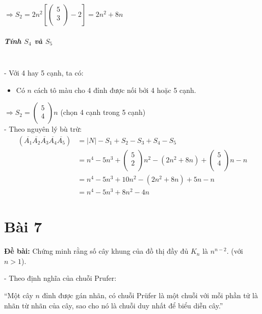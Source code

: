 \documentclass[12pt]{article}
\begin{document}
\begin{sloppypar}
\(\Rightarrow S_{2} = 2n^{2}\left[\begin{pmatrix} 5 \\ 3 \\ \end{pmatrix} - 2\right] = 2n^{2} + 8n\)


\subparagraph{Tính \(S_{4}\) và \(S_{5}\)}\mbox{}\\

- Với 4 hay 5 cạnh, ta có:
\begin{itemize}
    \item Có \(n\) cách tô màu cho 4 đỉnh được nối bởi 4 hoặc 5 cạnh.
\end{itemize}

\(\Rightarrow S_{2} =  \begin{pmatrix} 5 \\ 4 \\ \end{pmatrix}n\) (chọn 4 cạnh trong 5 cạnh) \\

- Theo nguyên lý bù trừ:
\begin{align*}
    (\overline{A_{1}}\overline{A_{2}}\overline{A_{3}}\overline{A_{4}}\overline{A_{5}}) & = |N| - S_{1} + S_{2} - S_{3} + S_{4} - S_{5} \\
    & = n^{4} - 5n^{3} + \begin{pmatrix} 5 \\ 2 \\ \end{pmatrix}n^{2} - (2n^{2} + 8n) + \begin{pmatrix} 5 \\ 4 \\ \end{pmatrix}n-n \\
    & = n^{4} - 5n^{3} + 10n^{2} - (2n^{2} + 8n) + 5n -n \\
    & = n^{4} - 5n^{3} + 8n^{2} - 4n
\end{align*}

\section{Bài 7}
\begin{tcolorbox}
    \textbf{Đề bài:} Chứng minh rằng số cây khung của đồ thị đầy đủ \(K_{n}\) là \(n^{n-2}\).
    (với \(n > 1\)).
\end{tcolorbox}

- Theo định nghĩa của chuỗi Prufer:

\begin{center}
``Một cây \(n\) đỉnh được gán nhãn, có chuỗi Prüfer là một chuỗi với mỗi phần tử là nhãn từ  nhãn của cây, sao cho nó là chuỗi duy nhất để biểu diễn cây.''
\end{center}


\end{sloppypar}
\end{document}

